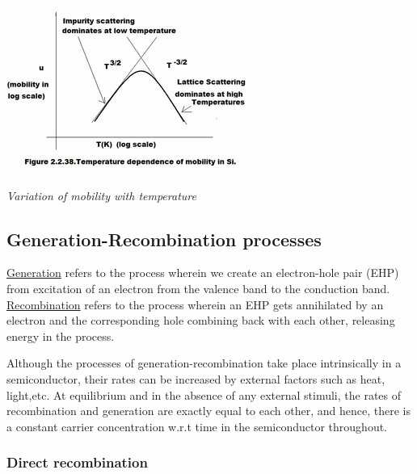 \documentclass[12 pt]{article}
\begin{document}
  \par
   \begin{center}
   \includegraphics{mobility_temp_50.jpeg}
   \end{center}
    \begin{center}
      \emph{\hspace{2.5cm}Variation of mobility with temperature \newline}
  \end{center}
\par

\subsection{Generation-Recombination processes}

\href{https://en.wikipedia.org/wiki/Carrier_generation_and_recombination#:~:text=Carrier%20generation%20describes%20processes%20by,hole%20in%20the%20valence%20band.}{Generation} refers to the process wherein we create an electron-hole pair (EHP) from excitation of an electron from the valence band to the conduction band. \href{https://en.wikipedia.org/wiki/Carrier_generation_and_recombination#:~:text=Carrier%20generation%20describes%20processes%20by,hole%20in%20the%20valence%20band.}{Recombination} refers to the process wherein an EHP gets annihilated by an electron and the corresponding hole combining back with each other, releasing energy in the process. \par

Although the processes of generation-recombination take place intrinsically in a semiconductor, their rates can be increased by external factors such as heat, light,etc. At equilibrium and in the absence of any external stimuli, the rates of recombination and generation are exactly equal to each other, and hence, there is a constant carrier concentration w.r.t time in the semiconductor throughout. \par

\subsubsection{Direct recombination}
\end{document}
